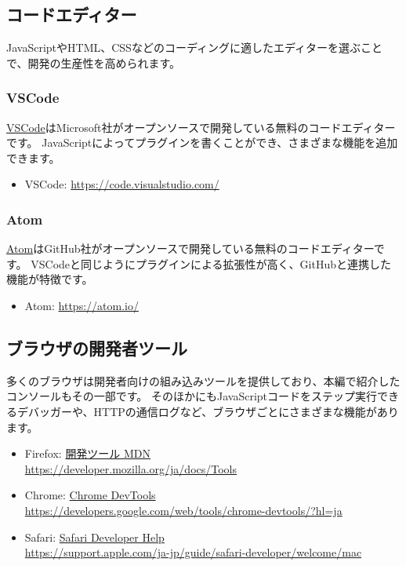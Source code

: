 \hypertarget{code-editor}{%
\subsection{コードエディター}\label{code-editor}}

JavaScriptやHTML、CSSなどのコーディングに適したエディターを選ぶことで、開発の生産性を高められます。

\hypertarget{vscode}{%
\subsubsection{VSCode}\label{vscode}}

\href{https://code.visualstudio.com/}{VSCode}はMicrosoft社がオープンソースで開発している無料のコードエディターです。
JavaScriptによってプラグインを書くことができ、さまざまな機能を追加できます。
\begin{itemize}
\item VSCode: \url{https://code.visualstudio.com/}
\end{itemize}

\hypertarget{atom}{%
\subsubsection{Atom}\label{atom}}

\href{https://atom.io/}{Atom}はGitHub社がオープンソースで開発している無料のコードエディターです。
VSCodeと同じようにプラグインによる拡張性が高く、GitHubと連携した機能が特徴です。
\begin{itemize}
\item Atom: \url{https://atom.io/}
\end{itemize}

\hypertarget{browser-devtools}{%
\subsection{ブラウザの開発者ツール}\label{browser-devtools}}

多くのブラウザは開発者向けの組み込みツールを提供しており、本編で紹介したコンソールもその一部です。
そのほかにもJavaScriptコードをステップ実行できるデバッガーや、HTTPの通信ログなど、ブラウザごとにさまざまな機能があります。

\begin{itemize}
\item
  Firefox: \href{https://developer.mozilla.org/ja/docs/Tools}{開発ツール
  \textbar{} MDN}\\
  \url{https://developer.mozilla.org/ja/docs/Tools}
\item
  Chrome:
  \href{https://developers.google.com/web/tools/chrome-devtools/?hl=ja}{Chrome
  DevTools}\\
  \url{https://developers.google.com/web/tools/chrome-devtools/?hl=ja}
\item
  Safari:
  \href{https://support.apple.com/ja-jp/guide/safari-developer/welcome/mac}{Safari
  Developer Help}\\
  \url{https://support.apple.com/ja-jp/guide/safari-developer/welcome/mac}
\end{itemize}

